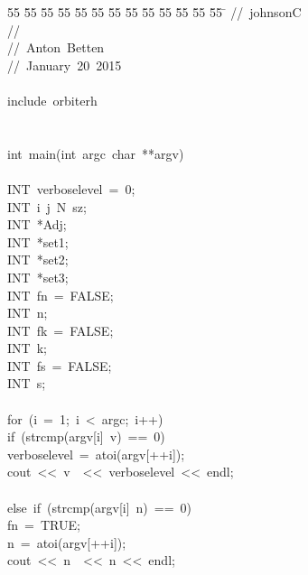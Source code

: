 %
%
\begin{tabbing}
55 \= 55 \= 55 \= 55 \= 55 \= 55 \= 55 \= 55 \= 55 \= 55 \= 55 \= 55 \= 55 \= \kill
//\ johnsonC\\[0pt]
//\ \\[0pt]
//\ Anton\ Betten\\[0pt]
//\ January\ 20\ 2015\\[0pt]
\\[0pt]
include\ orbiterh\\[0pt]
\\[0pt]
\\[0pt]
int\ main(int\ argc\ char\ **argv)\\[0pt]
\\[0pt]
\>INT\ verboselevel\ =\ 0;\\[0pt]
\>INT\ i\ j\ N\ sz;\\[0pt]
\>INT\ *Adj;\\[0pt]
\>INT\ *set1;\\[0pt]
\>INT\ *set2;\\[0pt]
\>INT\ *set3;\\[0pt]
\>INT\ fn\ =\ FALSE;\\[0pt]
\>INT\ n;\\[0pt]
\>INT\ fk\ =\ FALSE;\\[0pt]
\>INT\ k;\\[0pt]
\>INT\ fs\ =\ FALSE;\\[0pt]
\>INT\ s;\\[0pt]
\\[0pt]
\>for\ (i\ =\ 1;\ i\ <\ argc;\ i++)\ \\[0pt]
\>\>if\ (strcmp(argv[i]\ v)\ ==\ 0)\ \\[0pt]
\>\>\>verboselevel\ =\ atoi(argv[++i]);\\[0pt]
\>\>\>cout\ <<\ v\ \ <<\ verboselevel\ <<\ endl;\\[0pt]
\>\>\>\\[0pt]
\>\>else\ if\ (strcmp(argv[i]\ n)\ ==\ 0)\ \\[0pt]
\>\>\>fn\ =\ TRUE;\\[0pt]
\>\>\>n\ =\ atoi(argv[++i]);\\[0pt]
\>\>\>cout\ <<\ n\ \ <<\ n\ <<\ endl;\\[0pt]

\end{tabbing}
